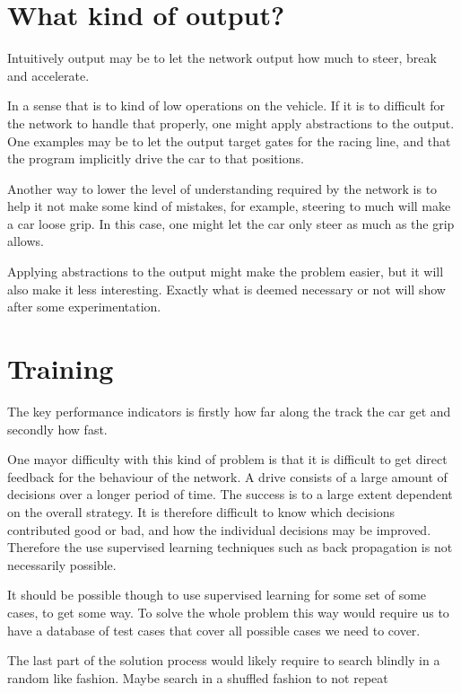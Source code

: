 \section{What kind of output?}
Intuitively output may be to let the network output how much to steer, break and accelerate. 

In a sense that is to kind of low operations on the vehicle. If it is to difficult for the network to handle that properly, one might apply abstractions to the output. One examples may be to let the output target gates for the racing line, and that the program implicitly drive the car to that positions. 

Another way to lower the level of understanding required by the network is to help it not make some kind of mistakes, for example, steering to much will make a car loose grip. In this case, one might let the car only steer as much as the grip allows.

Applying abstractions to the output might make the problem easier, but it will also make it less interesting. Exactly what is deemed necessary or not will show after some experimentation.



\section{Training}
The key performance indicators is firstly how far along the track the car get and secondly how fast.

One mayor difficulty with this kind of problem is that it is difficult to get direct feedback for the behaviour of the network. A drive consists of a large amount of decisions over a longer period of time. The success is to a large extent dependent on the overall strategy. It is therefore difficult to know which decisions contributed good or bad, and how the individual decisions may be improved. Therefore the use supervised learning techniques such as back propagation is not necessarily possible.

It should be possible though to use supervised learning for some set of some cases, to get some way. To solve the whole problem this way would require us to have a database of test cases that cover all possible cases we need to cover. 

The last part of the solution process would likely require to search blindly in a random like fashion. Maybe search in a shuffled fashion to not repeat 

